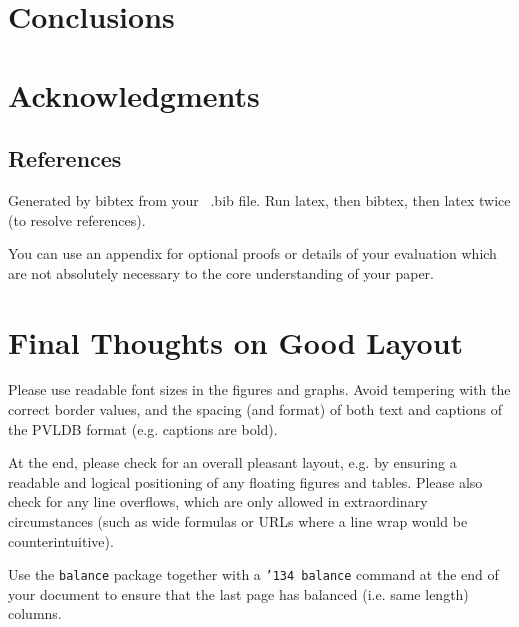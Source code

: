 \documentclass{vldb}
\begin{document}
\section{Conclusions}


\balance

\section{Acknowledgments}



\subsection{References}
Generated by bibtex from your ~.bib file.  Run latex,
then bibtex, then latex twice (to resolve references).


\begin{appendix}
You can use an appendix for optional proofs or details of your evaluation which are not absolutely necessary to the core understanding of your paper. 

\section{Final Thoughts on Good Layout}
Please use readable font sizes in the figures and graphs. Avoid tempering with the correct border values, and the spacing (and format) of both text and captions of the PVLDB format (e.g. captions are bold).

At the end, please check for an overall pleasant layout, e.g. by ensuring a readable and logical positioning of any floating figures and tables. Please also check for any line overflows, which are only allowed in extraordinary circumstances (such as wide formulas or URLs where a line wrap would be counterintuitive).

Use the \texttt{balance} package together with a \texttt{\char'134 balance} command at the end of your document to ensure that the last page has balanced (i.e. same length) columns.

\end{appendix}
\end{document}
